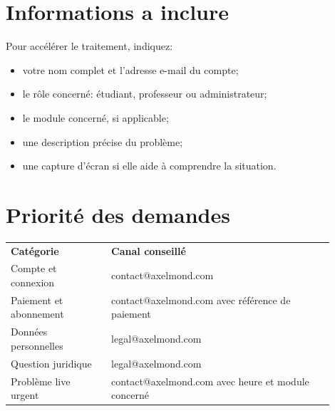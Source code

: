 \documentclass[11pt,a4paper]{article}
\begin{document}
\section{Informations a inclure}
Pour accélérer le traitement, indiquez:
\begin{itemize}
  \item votre nom complet et l'adresse e-mail du compte;
  \item le rôle concerné: étudiant, professeur ou administrateur;
  \item le module concerné, si applicable;
  \item une description précise du problème;
  \item une capture d'écran si elle aide à comprendre la situation.
\end{itemize}

\section{Priorité des demandes}
\begin{longtable}{p{0.28\linewidth}p{0.62\linewidth}}
\textbf{Catégorie} & \textbf{Canal conseillé} \\
Compte et connexion & contact@axelmond.com \\
Paiement et abonnement & contact@axelmond.com avec référence de paiement \\
Données personnelles & legal@axelmond.com \\
Question juridique & legal@axelmond.com \\
Problème live urgent & contact@axelmond.com avec heure et module concerné \\
\end{longtable}

\PAContactBlock
\end{document}
